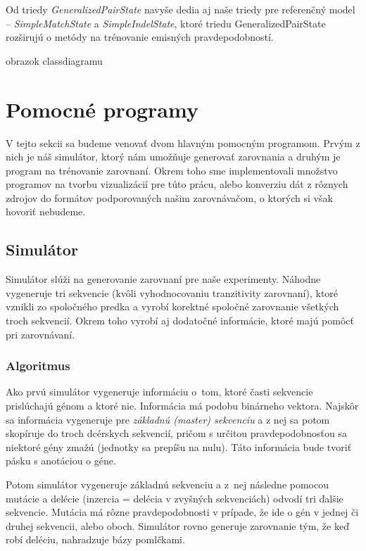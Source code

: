 Od triedy \textit{GeneralizedPairState} navyše dedia aj naše triedy pre referenčný model -- \textit{SimpleMatchState} a \textit{SimpleIndelState}, ktoré triedu GeneralizedPairState rozširujú o metódy na trénovanie emisných pravdepodobností.

\todo obrazok classdiagramu

\section{Pomocné programy}
V tejto sekcii sa budeme venovať dvom hlavným pomocným programom. Prvým z nich je náš simulátor, ktorý nám umožňuje generovať zarovnania a druhým je program na trénovanie zarovnaní. Okrem toho sme implementovali množstvo programov na tvorbu vizualizácií pre túto prácu, alebo konverziu dát z rôznych zdrojov do formátov podporovaných našim zarovnávačom, o ktorých si však hovoriť nebudeme.
\subsection{Simulátor}
\label{subsec:simulator}

Simulátor slúži na generovanie zarovnaní pre naše experimenty. Náhodne vygeneruje tri sekvencie (kvôli vyhodnocovaniu tranzitivity zarovnaní), ktoré vznikli zo spoločného predka a vyrobí korektné spoločné zarovnanie všetkých troch sekvencií. Okrem toho vyrobí aj dodatočné informácie, ktoré majú pomôcť pri zarovnávaní.

\subsubsection{Algoritmus}
Ako prvú simulátor vygeneruje informáciu o~tom, ktoré časti sekvencie prislúchajú génom a ktoré nie. Informácia má podobu binárneho vektora.
Najskôr sa informácia vygeneruje pre \textit{základnú (master) sekvenciu} a z nej sa potom skopíruje do troch dcérskych sekvencií, pričom s určitou pravdepodobnosťou sa niektoré gény zmažú (jednotky sa prepíšu na nulu). Táto informácia bude tvoriť pásku s anotáciou o géne.

Potom simulátor vygeneruje základnú sekvenciu a z~nej následne pomocou mutácie a delécie (inzercia = delécia v zvyšných sekvenciách) odvodí tri ďalšie sekvencie. Mutácia má rôzne pravdepodobnosti v prípade, že ide o gén v jednej či druhej sekvencii, alebo oboch.
Simulátor rovno generuje zarovnanie tým, že keď robí deléciu, nahradzuje bázy pomlčkami.


